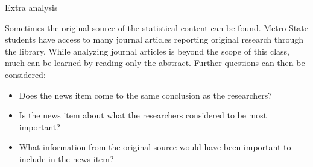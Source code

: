 \documentclass[xcolor=table]{beamer}
\begin{document}
\begin{frame}{Extra analysis}
\begin{block}{}
\large
Sometimes the original source of the statistical content can be found. Metro State students have access to many journal articles reporting original research through the library. While analyzing journal articles is beyond the scope of this class, much can be learned by reading only the abstract. Further questions can then be considered:
\begin{itemize}
\item Does the news item come to the same conclusion as the researchers?
\item Is the news item about what the researchers considered to be most important?
\item What information from the original source would have been important to include in the news item?
\end{itemize}
\end{block}
\end{frame}
\end{document}
